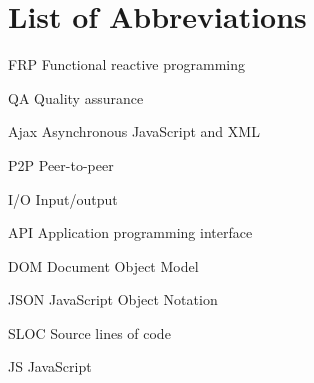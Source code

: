 \chapter*{List of Abbreviations}

\begin{abbreviations}
\item[FRP] Functional reactive programming
\item[QA] Quality assurance
\item[Ajax] Asynchronous JavaScript and XML
\item[P2P] Peer-to-peer
\item[I/O] Input/output
\item[API] Application programming interface
\item[DOM] Document Object Model
\item[JSON] JavaScript Object Notation
\item[SLOC] Source lines of code
\item[JS] JavaScript
\end{abbreviations}
